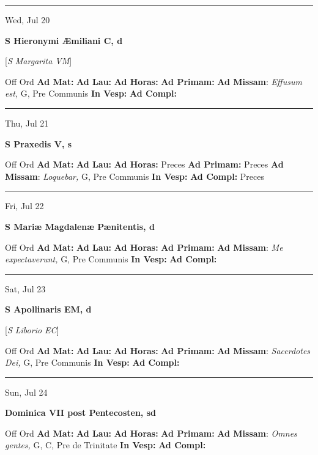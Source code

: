 \documentclass[letterpaper, 10pt]{article}
\begin{document}
\hrule
\begin{center}
Wed, Jul 20
\end{center}\textbf{ \large S Hieronymi Æmiliani C, \textnormal{\normalsize d}}

[\textit{S Margarita VM}]
\begin{justify}
Off Ord
\textbf{Ad Mat: }
\textbf{Ad Lau: }
\textbf{Ad Horas: }
\textbf{Ad Primam: }
\textbf{Ad Missam}: \textit{Effusum est,} G, Pre Communis
\textbf{In Vesp: }
\textbf{Ad Compl: }\end{justify}



\hrule
\begin{center}
Thu, Jul 21
\end{center}\textbf{ \large S Praxedis V, \textnormal{\normalsize s}}
\begin{justify}
Off Ord
\textbf{Ad Mat: }
\textbf{Ad Lau: }
\textbf{Ad Horas: }Preces
\textbf{Ad Primam: }Preces
\textbf{Ad Missam}: \textit{Loquebar,} G, Pre Communis
\textbf{In Vesp: }
\textbf{Ad Compl: }Preces\end{justify}



\hrule
\begin{center}
Fri, Jul 22
\end{center}\textbf{ \large S Mariæ Magdalenæ Pænitentis, \textnormal{\normalsize d}}
\begin{justify}
Off Ord
\textbf{Ad Mat: }
\textbf{Ad Lau: }
\textbf{Ad Horas: }
\textbf{Ad Primam: }
\textbf{Ad Missam}: \textit{Me expectaverunt,} G, Pre Communis
\textbf{In Vesp: }
\textbf{Ad Compl: }\end{justify}



\hrule
\begin{center}
Sat, Jul 23
\end{center}\textbf{ \large S Apollinaris EM, \textnormal{\normalsize d}}

[\textit{S Liborio EC}]
\begin{justify}
Off Ord
\textbf{Ad Mat: }
\textbf{Ad Lau: }
\textbf{Ad Horas: }
\textbf{Ad Primam: }
\textbf{Ad Missam}: \textit{Sacerdotes Dei,} G, Pre Communis
\textbf{In Vesp: }
\textbf{Ad Compl: }\end{justify}



\hrule
\begin{center}
Sun, Jul 24
\end{center}\textbf{ \large Dominica VII post Pentecosten, \textnormal{\normalsize sd}}
\begin{justify}
Off Ord
\textbf{Ad Mat: }
\textbf{Ad Lau: }
\textbf{Ad Horas: }
\textbf{Ad Primam: }
\textbf{Ad Missam}: \textit{Omnes gentes,} G, C, Pre de Trinitate
\textbf{In Vesp: }
\textbf{Ad Compl: }\end{justify}
\end{document}
